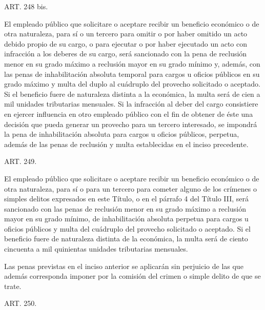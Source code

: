     ART. 248 bis.

    El empleado público que solicitare o aceptare recibir un beneficio económico o de otra naturaleza, para sí o un tercero para omitir o por haber omitido un acto debido propio de su cargo, o para ejecutar o por haber ejecutado un acto con infracción a los deberes de su cargo, será sancionado con la pena de reclusión menor en su grado máximo a reclusión mayor en su grado mínimo y, además, con las penas de inhabilitación absoluta temporal para cargos u oficios públicos en su grado máximo y multa del duplo al cuádruplo del provecho solicitado o aceptado. Si el beneficio fuere de naturaleza distinta a la económica, la multa será de cien a mil unidades tributarias mensuales.
    Si la infracción al deber del cargo consistiere en ejercer influencia en otro empleado público con el fin de obtener de éste una decisión que pueda generar un provecho para un tercero interesado, se impondrá la pena de inhabilitación absoluta para cargos u oficios públicos, perpetua, además de las penas de reclusión y multa establecidas en el inciso precedente.




    ART. 249.

    El empleado público que solicitare o aceptare recibir un beneficio económico o de otra naturaleza, para sí o para un tercero para cometer alguno de los crímenes o simples delitos expresados en este Título, o en el párrafo 4 del Título III, será sancionado con las penas de reclusión menor en su grado máximo a reclusión mayor en su grado mínimo, de inhabilitación absoluta perpetua para cargos u oficios públicos y multa del cuádruplo del provecho solicitado o aceptado. Si el beneficio fuere de naturaleza distinta de la económica, la multa será de ciento cincuenta a mil quinientas unidades tributarias mensuales.

    Las penas previstas en el inciso anterior se aplicarán sin perjuicio de las que además corresponda imponer por la comisión del crimen o simple delito de que se trate.




    ART. 250.


